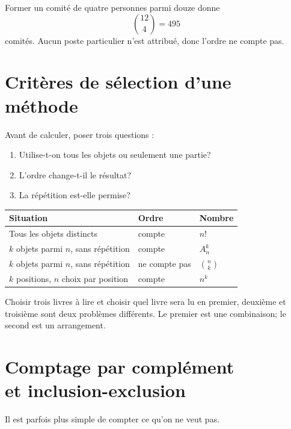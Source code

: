 \documentclass[12pt,a4paper,openany]{book}
\begin{document}
\begin{examplebox}
Former un comité de quatre personnes parmi douze donne
\[
\binom{12}{4}=495
\]
comités. Aucun poste particulier n'est attribué, donc l'ordre ne compte pas.
\end{examplebox}

\section{Critères de sélection d'une méthode}

\begin{methodbox}
Avant de calculer, poser trois questions :
\begin{enumerate}
\item Utilise-t-on tous les objets ou seulement une partie?
\item L'ordre change-t-il le résultat?
\item La répétition est-elle permise?
\end{enumerate}
\begin{center}
\begin{tabular}{lll}
\toprule
Situation & Ordre & Nombre \\
\midrule
Tous les objets distincts & compte & $n!$ \\
$k$ objets parmi $n$, sans répétition & compte & $A_n^k$ \\
$k$ objets parmi $n$, sans répétition & ne compte pas & $\binom nk$ \\
$k$ positions, $n$ choix par position & compte & $n^k$ \\
\bottomrule
\end{tabular}
\end{center}
\end{methodbox}

\begin{counterbox}
Choisir trois livres à lire et choisir quel livre sera lu en premier, deuxième et troisième sont deux problèmes différents. Le premier est une combinaison; le second est un arrangement.
\end{counterbox}

\section[Comptage par complément et inclusion-exclusion]{Comptage par complément\\et inclusion-exclusion}

Il est parfois plus simple de compter ce qu'on ne veut pas.
\end{document}
